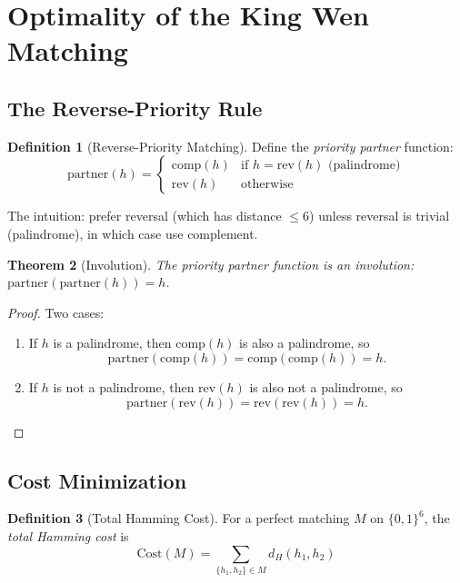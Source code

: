 \documentclass[11pt]{article}
\theoremstyle{definition}
\newtheorem{definition}{Definition}[section]
\theoremstyle{plain}
\newtheorem{theorem}[definition]{Theorem}
\newcommand{\B}{\{0,1\}}
\newcommand{\Ham}{d_H}
\newcommand{\comp}{\mathrm{comp}}
\newcommand{\rev}{\mathrm{rev}}
\begin{document}
\section{Optimality of the King Wen Matching}

\subsection{The Reverse-Priority Rule}

\begin{definition}[Reverse-Priority Matching]
Define the \emph{priority partner} function:
\[
\mathrm{partner}(h) =
\begin{cases}
\comp(h) & \text{if } h = \rev(h) \text{ (palindrome)} \\
\rev(h) & \text{otherwise}
\end{cases}
\]
\end{definition}

The intuition: prefer reversal (which has distance $\leq 6$) unless reversal is trivial (palindrome), in which case use complement.

\begin{theorem}[Involution]\label{thm:involution}
The priority partner function is an involution: $\mathrm{partner}(\mathrm{partner}(h)) = h$.
\end{theorem}

\begin{proof}
Two cases:
\begin{enumerate}
    \item If $h$ is a palindrome, then $\comp(h)$ is also a palindrome, so
    \[
    \mathrm{partner}(\comp(h))=\comp(\comp(h))=h.
    \]
    \item If $h$ is not a palindrome, then $\rev(h)$ is also not a palindrome, so
    \[
    \mathrm{partner}(\rev(h))=\rev(\rev(h))=h.
    \]
\end{enumerate}
\end{proof}

\subsection{Cost Minimization}

\begin{definition}[Total Hamming Cost]
For a perfect matching $M$ on $\B^6$, the \emph{total Hamming cost} is
\[
\mathrm{Cost}(M) = \sum_{\{h_1, h_2\} \in M} \Ham(h_1, h_2)
\]
\end{definition}
\end{document}
